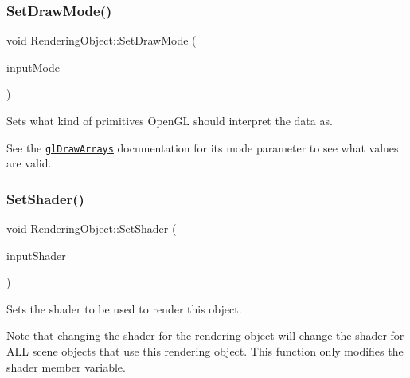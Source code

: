 \subsubsection{\texorpdfstring{Set\+Draw\+Mode()}{SetDrawMode()}}
{\footnotesize\ttfamily void Rendering\+Object\+::\+Set\+Draw\+Mode (\begin{DoxyParamCaption}\item[{G\+Lenum}]{input\+Mode }\end{DoxyParamCaption})\hspace{0.3cm}{\ttfamily [inline]}}



Sets what kind of primitives Open\+GL should interpret the data as. 

See the \href{https://www.opengl.org/sdk/docs/man/html/glDrawArrays.xhtml}{\tt gl\+Draw\+Arrays} documentation for its \textquotesingle{}mode\textquotesingle{} parameter to see what values are valid. \hypertarget{class_rendering_object_a22311d08bb7559f6b913afe314a5031e}{}\label{class_rendering_object_a22311d08bb7559f6b913afe314a5031e} 
\subsubsection{\texorpdfstring{Set\+Shader()}{SetShader()}}
{\footnotesize\ttfamily void Rendering\+Object\+::\+Set\+Shader (\begin{DoxyParamCaption}\item[{std\+::shared\+\_\+ptr$<$ class \hyperlink{class_shader_program}{Shader\+Program} $>$}]{input\+Shader }\end{DoxyParamCaption})\hspace{0.3cm}{\ttfamily [virtual]}}



Sets the shader to be used to render this object. 

Note that changing the shader for the rendering object will change the shader for A\+LL scene objects that use this rendering object. This function only modifies the \textquotesingle{}shader\textquotesingle{} member variable. \hypertarget{class_rendering_object_a095317dd60a7558c22409e2fabcb252e}{}\label{class_rendering_object_a095317dd60a7558c22409e2fabcb252e} 
